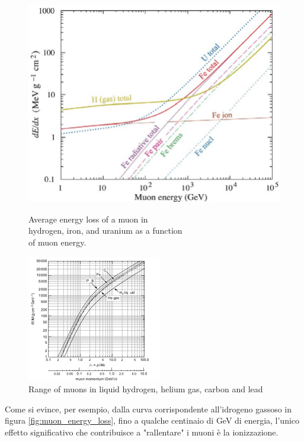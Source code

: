 \documentclass[a4paper,11pt]{book}
\begin{document}
\begin{figure}[hbtp]
\begin{minipage}[c]{0.5\textwidth}
\centering
\includegraphics{pictures/muon_energy_loss.pdf}
\caption{Average energy loss of a muon in \\hydrogen, iron, and uranium as a function \\of muon energy.}
\label{fig:muon_energy_loss}
\end{minipage}  \hfill
\begin{minipage}[c]{0.5\textwidth}
\centering
\includegraphics[scale=1.8]{pictures/muon_range.pdf}
\caption{Range of muons in liquid hydrogen, helium gas, carbon and lead}
\label{fig:muon_range}
\end{minipage}
\end{figure}

Come si evince, per esempio, dalla curva corrispondente all'idrogeno gassoso in figura \ref{fig:muon_energy_loss}, fino a qualche centinaio di GeV di energia, l'unico effetto significativo che contribuisce a "rallentare" i muoni è la ionizzazione.\\
\end{document}

